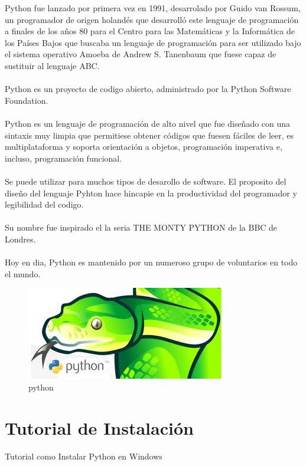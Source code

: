 \documentclass[11pt]{article} %
\begin{document}
Python fue lanzado por primera vez en 1991, desarrolado por Guido van Rossum, un programador de origen holandés que desarrolló este lenguaje de programación a finales de los años 80 para el Centro para las Matemáticas y la Informática de los Países Bajos que buscaba un lenguaje de programación para ser utilizado bajo el sistema operativo Amoeba de Andrew S. Tanenbaum que fuese capaz de sustituir al lenguaje ABC.
\\\\
Python es un proyecto de codigo abierto, administrado por la Python Software Foundation.
\\\\
Python es un lenguaje de programación de alto nivel que fue diseñado con una sintaxis muy limpia que permitiese obtener códigos que fuesen fáciles de leer, es multiplataforma y soporta orientación a objetos, programación imperativa e, incluso, programación funcional.
\\\\
Se puede utilizar para muchos tipos de desarollo de software. El proposito del diseño del lenguaje Pyhton hace hincapie en  la productividad del programador y legibilidad del codigo.
\\\\
Su nombre fue inspirado el la seria THE MONTY PYTHON de la BBC de Londres.
\\\\
Hoy en dia, Python es mantenido por un numeroso grupo de voluntarios en todo el mundo.


\begin{figure}[htbp]
	\begin{center}
		\includegraphics[width=.50\textwidth]{./imagenes/python1.png}
		\caption{python}
		\label{python}
	\end{center}
\end{figure}

\section{Tutorial de Instalación}

Tutorial como Instalar Python en Windows\\
 
\end{document}
